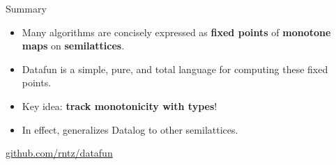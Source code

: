 \documentclass{beamer}
\newcommand{\m}[1]{\ensuremath{\mathbf{#1}}}
\newcommand{\ms}{\mathsf}
\newcommand{\x}{\times}
\begin{document}





\begin{frame}{Summary}\large

  \begin{itemize}
  \item Many algorithms are concisely expressed as \textbf{fixed points} of
    \textbf{monotone maps} on \textbf{semilattices}.
  \item Datafun is a simple, pure, and total language for computing these fixed
    points.
  \item Key idea: \textbf{track monotonicity with types}!
  \item In effect, generalizes Datalog to other semilattices.
  \end{itemize}

  \vspace{1em}
  \begin{center}
    {\Large \url{github.com/rntz/datafun}}
  \end{center}
\end{frame}
\end{document}
